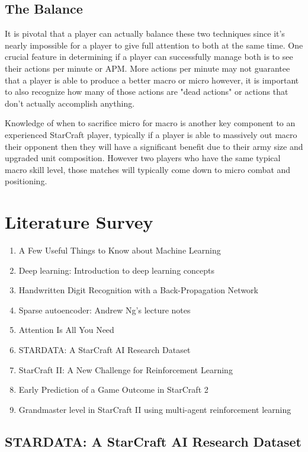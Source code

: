 \documentclass[a4paper,12pt]{report}
\begin{document}
\subsection{The Balance}

It is pivotal that a player can actually balance these two techniques since it’s nearly impossible for a player to give full attention to both at the same time. One crucial feature in determining if a player can successfully manage both is to see their actions per minute or APM. More actions per minute may not guarantee that a player is able to produce a better macro or micro however, it is important to also recognize how many of those actions are "dead actions" or actions that don’t actually accomplish anything.

Knowledge of when to sacrifice micro for macro is another key component to an experienced StarCraft player, typically if a player is able to massively out macro their opponent then they will have a significant benefit due to their army size and upgraded unit composition. However two players who have the same typical macro skill level, those matches will typically come down to micro combat and positioning.

\section{Literature Survey}

\begin{enumerate}\setlength\itemsep{-.1cm}
\item A Few Useful Things to Know about Machine Learning
\item Deep learning: Introduction to deep learning concepts
\item Handwritten Digit Recognition with a Back-Propagation Network
\item Sparse autoencoder: Andrew Ng’s lecture notes
\item Attention Is All You Need
\item STARDATA: A StarCraft AI Research Dataset
\item StarCraft II: A New Challenge for Reinforcement Learning
\item Early Prediction of a Game Outcome in StarCraft 2
\item Grandmaster level in StarCraft II using multi-agent reinforcement learning
\end{enumerate}

\subsection{STARDATA: A StarCraft AI Research Dataset}
\end{document}

